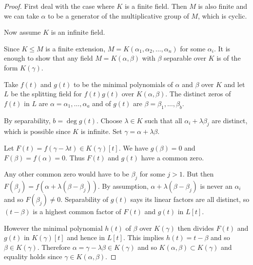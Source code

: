 \documentclass{article}
\begin{document}
\begin{proof}
    First deal with the case where $K$ is a finite field. Then $M$ is also finite and we can take $\alpha$ to be a generator of the multiplicative group of $M$, which is cyclic.

    Now assume $K$ is an infinite field.

    Since $K\leq M$ is a finite extension, $M = K(\alpha_1, \alpha_2, \dotsc, \alpha_n)$ for some $\alpha_i$.
    It is enough to show that any field $M = K(\alpha, \beta)$ with $\beta$ separable over $K$ is of the form $K(\gamma)$.

    Take $f(t)$ and $g(t)$ to be the minimal polynomials of $\alpha$ and $\beta$ over $K$ and let $L$ be the splitting field for $f(t) g(t)$ over $K(\alpha, \beta)$.
    The distinct zeros of $f(t)$ in $L$ are $\alpha = \alpha_1, \dotsc, \alpha_a$ and of $g(t)$ are $\beta = \beta_1, \dotsc, \beta_b$.

    By separability, $b = \deg g(t)$.
    Choose $\lambda \in K$ such that all $\alpha_i + \lambda \beta_j$ are distinct, which is possible since $K$ is infinite.
    Set $\gamma = \alpha + \lambda \beta$.

    Let $F(t) = f(\gamma - \lambda t) \in K(\gamma)[t]$. We have $g(\beta) = 0$ and $F(\beta) = f(\alpha) = 0$. Thus $F(t)$ and $g(t)$ have a common zero.

    Any other common zero would have to be $\beta_j$ for some $j > 1$. But then $F(\beta_j) = f(\alpha + \lambda(\beta - \beta_j))$.
    By assumption, $\alpha + \lambda(\beta - \beta_j)$ is never an $\alpha_i$ and so $F(\beta_j) \neq 0$.
    Separability of $g(t)$ says its linear factors are all distinct, so $(t-\beta)$ is a highest common factor of $F(t)$ and $g(t)$ in $L[t]$.

    However the minimal polynomial $h(t)$ of $\beta$ over $K(\gamma)$ then divides $F(t)$ and $g(t)$ in $K(\gamma)[t]$ and hence in $L[t]$. This implies $h(t) = t - \beta$ and so $\beta \in K(\gamma)$.
    Therefore $\alpha = \gamma - \lambda \beta \in K(\gamma)$ and so $K(\alpha, \beta) \subset K(\gamma)$ and equality holds since $\gamma \in K(\alpha, \beta)$.
\end{proof}
\end{document}
